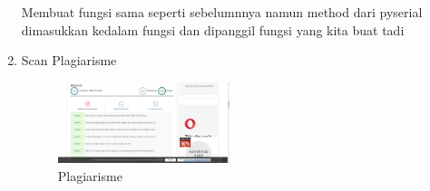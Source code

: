 \begin{enumerate}
Membuat fungsi sama seperti sebelumnnya namun method dari pyserial dimasukkan kedalam fungsi dan dipanggil fungsi yang kita buat tadi


\item Scan Plagiarisme
\begin{figure}[ht!]
	\includegraphics[width=5cm]{figures/5/1174079/plagiat.png}
	\centering
	\caption{Plagiarisme}
\end{figure}
\end{enumerate}